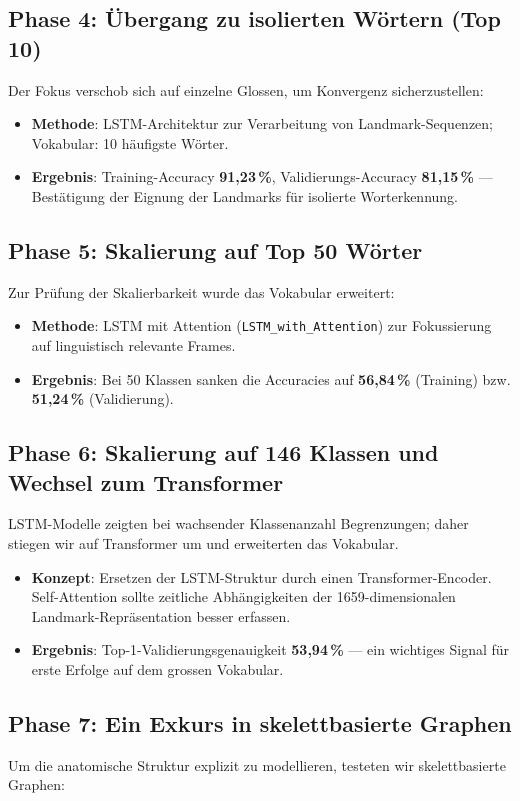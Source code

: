 \subsection{Phase 4: Übergang zu isolierten Wörtern (Top 10)}
Der Fokus verschob sich auf einzelne Glossen, um Konvergenz sicherzustellen:
\begin{itemize}
    \item \textbf{Methode}: LSTM-Architektur zur Verarbeitung von Landmark-Sequenzen; Vokabular: 10 häufigste Wörter.
    \item \textbf{Ergebnis}: Training-Accuracy \textbf{91,23\,\%}, Validierungs-Accuracy \textbf{81,15\,\%} — Bestätigung der Eignung der Landmarks für isolierte Worterkennung.
\end{itemize}

\subsection{Phase 5: Skalierung auf Top 50 Wörter}
Zur Prüfung der Skalierbarkeit wurde das Vokabular erweitert:
\begin{itemize}
    \item \textbf{Methode}: LSTM mit Attention (\texttt{LSTM\_with\_Attention}) zur Fokussierung auf linguistisch relevante Frames.
    \item \textbf{Ergebnis}: Bei 50 Klassen sanken die Accuracies auf \textbf{56,84\,\%} (Training) bzw. \textbf{51,24\,\%} (Validierung).
\end{itemize}

\subsection{Phase 6: Skalierung auf 146 Klassen und Wechsel zum Transformer}
LSTM-Modelle zeigten bei wachsender Klassenanzahl Begrenzungen; daher stiegen wir auf Transformer um und erweiterten das Vokabular.

\begin{itemize}
    \item \textbf{Konzept}: Ersetzen der LSTM-Struktur durch einen Transformer-Encoder. Self-Attention sollte zeitliche Abhängigkeiten der 1659-dimensionalen Landmark-Repräsentation besser erfassen.
    \item \textbf{Ergebnis}: Top-1-Validierungsgenauigkeit \textbf{53{,}94\,\%} — ein wichtiges Signal für erste Erfolge auf dem grossen Vokabular.
\end{itemize}

\subsection{Phase 7: Ein Exkurs in skelettbasierte Graphen}
Um die anatomische Struktur explizit zu modellieren, testeten wir skelettbasierte Graphen:

